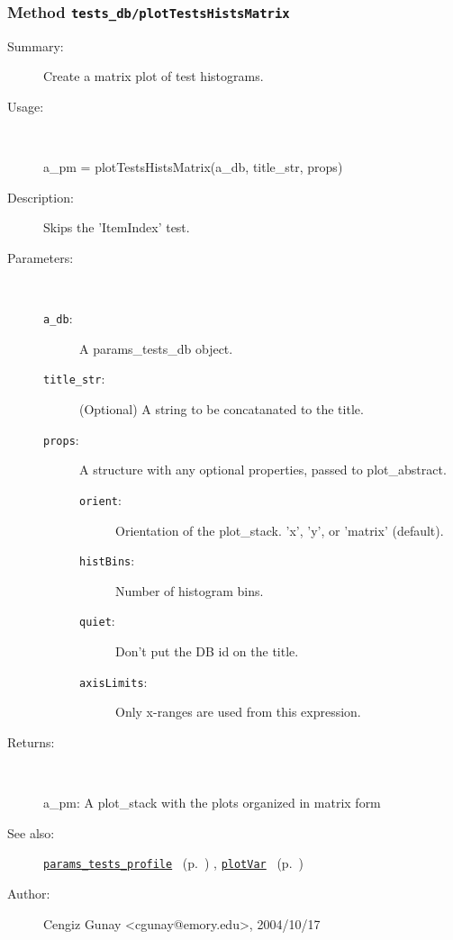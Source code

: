 \subsubsection[Method \texttt{plotTestsHistsMatrix}]{Method \texttt{tests\_db/plotTestsHistsMatrix}}%
%
\label{ref_tests_db__plotTestsHistsMatrix}%
\hypertarget{ref_tests_db__plotTestsHistsMatrix}{}%
\begin{description}
\item[Summary:]Create a matrix plot of test histograms.
%
\item[Usage:]~%
\begin{lyxcode}%
a\_pm = plotTestsHistsMatrix(a\_db, title\_str, props)
%
\end{lyxcode}%
%
\item[Description:]%
Skips the 'ItemIndex' test.
\item[Parameters:]~
\begin{description}%
\item[\texttt{a\_db}:]
 A params\_tests\_db object.
\item[\texttt{title\_str}:]
 (Optional) A string to be concatanated to the title.
\item[\texttt{props}:]
 A structure with any optional properties, passed to plot\_abstract.
\begin{description}%
\item[\texttt{orient}:]
 Orientation of the plot\_stack. 'x', 'y', or 'matrix' (default).
\item[\texttt{histBins}:]
 Number of histogram bins.
\item[\texttt{quiet}:]
 Don't put the DB id on the title.
\item[\texttt{axisLimits}:]
 Only x-ranges are used from this expression.
\end{description}%
\end{description}%
%
\item[Returns:]~

	a\_pm: A plot\_stack with the plots organized in matrix form
%
%
\item[See also:]%
\hyperlink{ref_params_tests_profile}{\texttt{params\_tests\_profile}}%
\ (p.~\pageref{ref_params_tests_profile})%
%
, \hyperlink{ref_plotVar}{\texttt{plotVar}}%
\ (p.~\pageref{ref_plotVar})%
%
%
\item[Author:]%
Cengiz Gunay <cgunay@emory.edu>, 2004/10/17%
\end{description}
\methodline%
